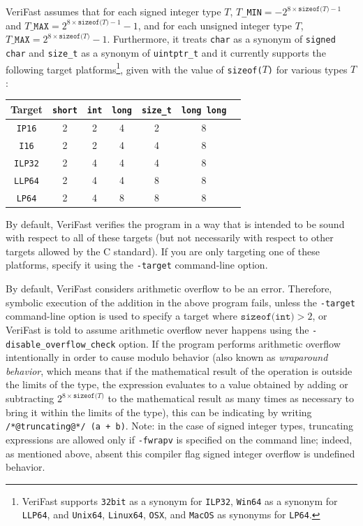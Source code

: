 \documentclass{article}
\begin{document}
VeriFast assumes that for each signed integer type $T$, $T$\texttt{\_MIN}${} = -2^{8\times\texttt{sizeof($T$)} - 1}$ and $\texttt{$T$\_MAX} = 2^{8\times\texttt{sizeof($T$)} - 1} - 1$, and for each unsigned integer type $T$, $\texttt{$T$\_MAX} = 2^{8\times\texttt{sizeof($T$)}} - 1$. Furthermore, it treats \lstinline!char! as a synonym of \lstinline!signed char! and \lstinline!size_t! as a synonym of \lstinline!uintptr_t! and it currently supports the following target platforms\footnote{VeriFast supports \texttt{32bit} as a synonym for \texttt{ILP32}, \texttt{Win64} as a synonym for \texttt{LLP64}, and \texttt{Unix64}, \texttt{Linux64}, \texttt{OSX}, and \texttt{MacOS} as synonyms for \texttt{LP64}.}, given with the value of \texttt{sizeof($T$)} for various types $T$:

\begin{center}
\begin{tabular}{ |c|c|c|c|c|c|c| }
 \hline
 Target & \texttt{short} & \texttt{int} & \texttt{long} & \texttt{size\_t} & \texttt{long long} \\ 
 \hline
 \verb|IP16| & 2 & 2 & 4 & 2 & 8 \\ 
 \verb|I16| & 2 & 2 & 4 & 4 & 8 \\
 \verb|ILP32| & 2 & 4 & 4 & 4 & 8 \\ 
 \verb|LLP64| & 2 & 4 & 4 & 8 & 8 \\
 \verb|LP64| & 2 & 4 & 8 & 8 & 8 \\
 \hline
\end{tabular}
\end{center}

By default, VeriFast verifies the program in a way that is intended to be sound with respect to all of these targets (but not necessarily with respect to other targets allowed by the C standard). If you are only targeting one of these platforms, specify it using the \texttt{-target} command-line option.

By default, VeriFast considers arithmetic overflow to be an error. Therefore, symbolic execution of the addition in the above program fails, unless the \texttt{-target} command-line option is used to specify a target where $\texttt{sizeof(int)} > 2$, or VeriFast is told to assume arithmetic overflow never happens using the \verb|-disable_overflow_check| option. If the program performs arithmetic overflow intentionally in order to cause modulo behavior (also known as \emph{wraparound behavior}, which means that if the mathematical result of the operation is outside the limits of the type, the expression evaluates to a value obtained by adding or subtracting $2^{8\times\texttt{sizeof($T$)}}$ to the mathematical result as many times as necessary to bring it within the limits of the type), this can be indicating by writing \lstinline|/*@truncating@*/ (a + b)|. Note: in the case of signed integer types, truncating expressions are allowed only if \verb|-fwrapv| is specified on the command line; indeed, as mentioned above, absent this compiler flag signed integer overflow is undefined behavior.
\end{document}
